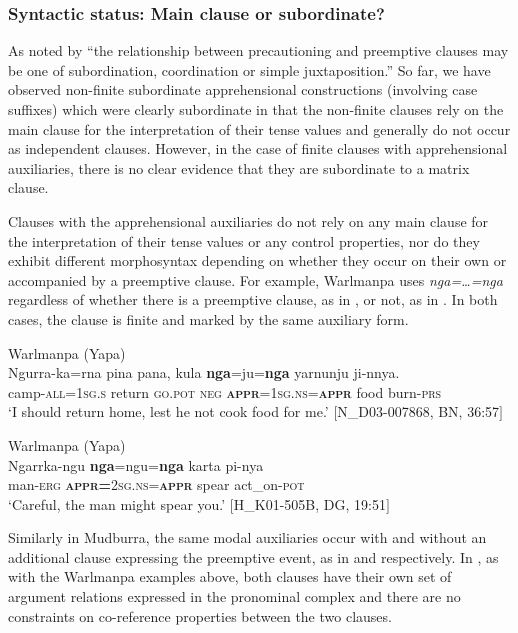 \documentclass[output=paper,colorlinks,citecolor=brown]{langscibook}
\begin{document}
\subsubsection{Syntactic status: Main clause or subordinate?}
\label{subsubsec:syntacticstatus}

As noted by \citet{vuillermet_workshop_2018} ``the relationship between precautioning and preemptive clauses may be one of subordination, coordination or simple juxtaposition.'' So far, we have observed non-finite subordinate apprehensional constructions (involving case suffixes) which were clearly subordinate in that the non-finite clauses rely on the main clause for the interpretation of their tense values and generally do not occur as independent clauses. However, in the case of finite clauses with apprehensional auxiliaries, there is no clear evidence that they are subordinate to a matrix clause.

Clauses with the apprehensional auxiliaries do not rely on any main clause for the interpretation of their tense values or any control properties, nor do they exhibit different morphosyntax depending on whether they occur on their own or accompanied by a preemptive clause. For example, Warlmanpa uses \textit{nga=\ldots=nga} regardless of whether there is a preemptive clause, as in , or not, as in . In both cases, the clause is finite and marked by the same auxiliary form. 

\ea 
\textnormal{Warlmanpa (Yapa)} \\
\gll Ngurra-ka=rna pina pana, kula \textbf{nga}=ju=\textbf{nga} yarnunju ji-nnya. \\
camp-\textsc{all=1sg.s} return \textsc{go.pot} \textsc{neg} \textbf{\textsc{appr}}=\textsc{1sg.ns=\textbf{appr}} food burn-\textsc{prs} \\
\glt `I should return home, lest he not cook food for me.' $[$N\_D03-007868, BN, 36:57$]$
\label{ex:bro45}
\z

\ea 
\textnormal{Warlmanpa (Yapa)} \\
\gll Ngarrka-ngu \textbf{nga}=ngu=\textbf{nga} karta pi-nya \\
man-\textsc{erg} \textbf{\textsc{appr=}}\textsc{2sg.ns=\textbf{appr}} spear act\_on-\textsc{pot} \\
\glt `Careful, the man might spear you.' $[$H\_K01-505B, DG, 19:51$]$
\label{ex:bro46}
\z

Similarly in Mudburra, the same modal auxiliaries occur with and without an additional clause expressing the preemptive event, as in  and  respectively. In , as with the Warlmanpa examples above, both clauses have their own set of argument relations expressed in the pronominal complex and there are no constraints on co-reference properties between the two clauses.
\end{document}
